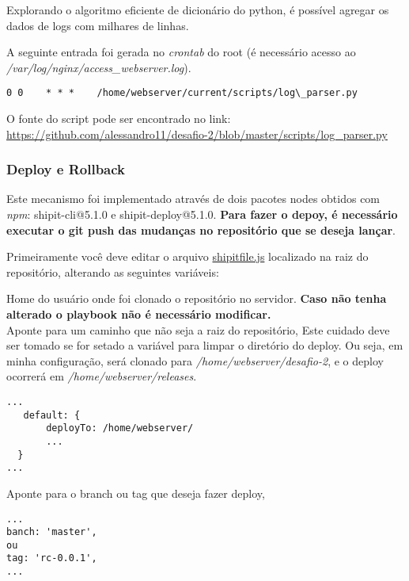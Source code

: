 Explorando o algoritmo eficiente de dicionário do python, é possível
agregar os dados de logs com milhares de linhas.

A seguinte entrada foi gerada no \emph{crontab} do root (é necessário
acesso ao \textit{/var/log/nginx/access\_webserver.log}).

\begin{verbatim}
0 0    * * *    /home/webserver/current/scripts/log\_parser.py
\end{verbatim}

O fonte do script pode ser encontrado no link:\\
\href{https://github.com/alessandro11/desafio-2/blob/master/scripts/log\_parser.py}{https://github.com/alessandro11/desafio-2/blob/master/scripts/log\_parser.py} \label{lnk:logparser}


\subsubsection{Deploy e Rollback}
Este mecanismo foi implementado através de dois pacotes nodes obtidos com
\emph{npm}: shipit-cli@5.1.0 e shipit-deploy@5.1.0. \textbf{Para fazer o depoy,
é necessário executar o git push das mudanças no repositório que se deseja lançar}.

Primeiramente você deve editar o arquivo
\href{https://github.com/alessandro11/desafio-2/blob/master/shipitfile.js}{shipitfile.js}
localizado na raiz do repositório, alterando as seguintes variáveis:

Home do usuário onde foi clonado o repositório no servidor. \textbf{Caso não
tenha alterado o playbook não é necessário modificar.}\\

\color{red}
Aponte para um caminho que não seja a raiz do repositório,
Este cuidado deve ser tomado se for setado a variável para limpar o
diretório do deploy. Ou seja, em minha configuração, será clonado
para \textit{/home/webserver/desafio-2}, e o deploy ocorrerá em
\textit{/home/webserver/releases}.

\color{black}
\begin{verbatim}
...
   default: {
       deployTo: /home/webserver/
       ...
  }
...
\end{verbatim}

Aponte para o branch ou tag que deseja fazer deploy,
\begin{verbatim}
...
banch: 'master',
ou
tag: 'rc-0.0.1',
...
\end{verbatim}


